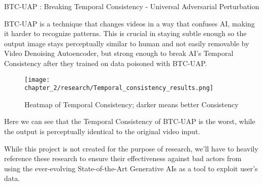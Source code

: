 \begin{enumerate}
\begin{figure}[h]
    \end{figure}
    \par BTC-UAP : Breaking Temporal Consistency - Universal Adversarial Perturbation

    BTC-UAP is a technique that changes videos in a way that confuses AI, making it harder to recognize patterns. This is crucial in staying subtle enough so the output image stays perceptually similar to human and not easily removable by Video Denoising Autoencoder, but strong enough to break AI's Temporal Consistency after they trained on data poisoned with BTC-UAP.

    \begin{figure}[h]
        \centering
        \texttt{[image: chapter\_2/research/Temporal\_consistency\_results.png]}
        \caption{Heatmap of Temporal Consistency; darker means better Consistency}
    
    \end{figure}

    Here we can see that the Temporal Consistency of BTC-UAP is the worst, while the output is perceptually identical to the original video input.
    
\end{enumerate}

While this project is not created for the purpose of research, we'll have to heavily reference these research to ensure their effectiveness against bad actors from using the ever-evolving State-of-the-Art Generative AIs as a tool to exploit user's data.